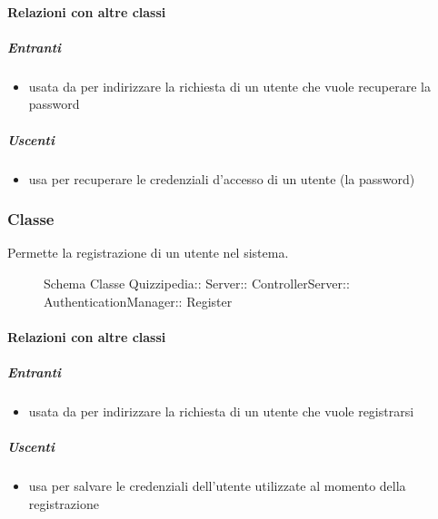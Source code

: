 \paragraph{Relazioni con altre classi}
\subparagraph{Entranti}
\begin{itemize}
\item usata da  per indirizzare la richiesta di un utente che vuole recuperare la password
\end{itemize}
\subparagraph{Uscenti}
\begin{itemize}
\item usa  per recuperare le credenziali d'accesso di un utente (la password)
\end{itemize}
\subsubsection{Classe }
Permette la registrazione di un utente nel sistema.
\begin{figure}[H]
\centering
\noindent{}
\caption[Schema Classe Register]{Schema Classe Quizzipedia:: Server:: ControllerServer:: AuthenticationManager:: Register}
\end{figure}
\paragraph{Relazioni con altre classi}
\subparagraph{Entranti}
\begin{itemize}
\item usata da  per indirizzare la richiesta di un utente che vuole registrarsi
\end{itemize}
\subparagraph{Uscenti}
\begin{itemize}
\item usa  per salvare le credenziali dell'utente utilizzate al momento della registrazione
\end{itemize}
